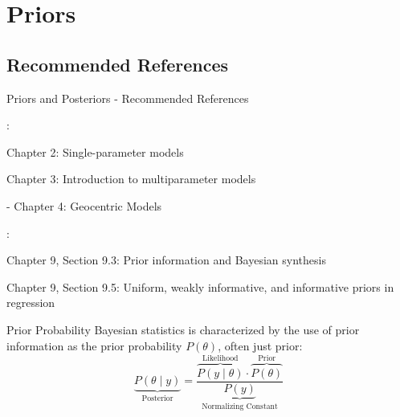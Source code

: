 \section{Priors}

\subsection{Recommended References}
\begin{frame}{Priors and Posteriors - Recommended References}
	\begin{vfilleditems}
		\item \textcite{gelman2013bayesian}:
		\begin{vfilleditems}
			\item Chapter 2: Single-parameter models
			\item Chapter 3: Introduction to multiparameter models
		\end{vfilleditems}
		\item \textcite{mcelreath2020statistical} - Chapter 4: Geocentric Models
		\item \textcite{gelman2020regression}:
		\begin{vfilleditems}
			\item Chapter 9, Section 9.3: Prior information and Bayesian synthesis
			\item Chapter 9, Section 9.5: Uniform, weakly informative, and informative priors in regression
		\end{vfilleditems}
		\item \textcite{vandeschootBayesianStatisticsModelling2021}
	\end{vfilleditems}
\end{frame}

\begin{frame}{Prior Probability }
	Bayesian statistics is characterized by the use of prior information
	as the prior probability $P(\theta)$, often just prior:
	$$
		\underbrace{P(\theta \mid y)}_{\text{Posterior}} = \frac{\overbrace{P(y \mid  \theta)}^{\text{Likelihood}} \cdot \overbrace{P(\theta)}^{\text{Prior}}}{\underbrace{P(y)}_{\text{Normalizing Constant}}}
	$$
\end{frame}

